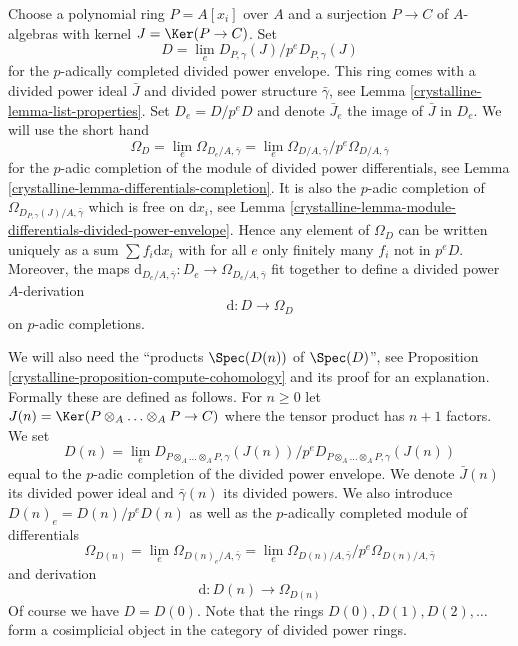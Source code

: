 \medskip\noindent
Choose a polynomial ring $P = A[x_i]$ over $A$ and a surjection $P \to C$
of $A$-algebras with kernel $J = \Ker(P \to C)$. Set
\begin{equation}
\label{equation-D}
D = \lim_e D_{P, \gamma}(J) / p^eD_{P, \gamma}(J)
\end{equation}
for the $p$-adically completed divided power envelope.
This ring comes with a divided power ideal $\bar J$ and divided power
structure $\bar \gamma$, see Lemma \ref{crystalline-lemma-list-properties}.
Set $D_e = D/p^eD$ and denote $\bar J_e$ the image of $\bar J$ in $D_e$.
We will use the short hand
\begin{equation}
\label{equation-omega-D}
\Omega_D = \lim_e \Omega_{D_e/A, \bar\gamma} =
\lim_e \Omega_{D/A, \bar\gamma}/p^e\Omega_{D/A, \bar\gamma}
\end{equation}
for the $p$-adic completion of the module of divided power differentials,
see Lemma \ref{crystalline-lemma-differentials-completion}.
It is also the $p$-adic completion of
$\Omega_{D_{P, \gamma}(J)/A, \bar\gamma}$
which is free on $\text{d}x_i$, see
Lemma \ref{crystalline-lemma-module-differentials-divided-power-envelope}.
Hence any element of $\Omega_D$ can be written uniquely as a sum
$\sum f_i\text{d}x_i$ with for all $e$ only finitely many $f_i$
not in $p^eD$. Moreover, the maps
$\text{d}_{D_e/A, \bar\gamma} : D_e \to \Omega_{D_e/A, \bar\gamma}$
fit together to define a divided power $A$-derivation
\begin{equation}
\label{equation-derivation-D}
\text{d} : D \longrightarrow \Omega_D
\end{equation}
on $p$-adic completions.

\medskip\noindent
We will also need the ``products $\Spec(D(n))$ of $\Spec(D)$'', see
Proposition \ref{crystalline-proposition-compute-cohomology} and its proof for an
explanation. Formally these are defined as follows. For $n \geq 0$ let
$J(n) = \Ker(P \otimes_A \ldots \otimes_A P \to C)$ where
the tensor product has $n + 1$ factors. We set
\begin{equation}
\label{equation-Dn}
D(n) = \lim_e
D_{P \otimes_A \ldots \otimes_A P, \gamma}(J(n))/
p^eD_{P \otimes_A \ldots \otimes_A P, \gamma}(J(n))
\end{equation}
equal to the $p$-adic completion of the divided power envelope.
We denote $\bar J(n)$ its divided power ideal and $\bar \gamma(n)$
its divided powers. We also introduce $D(n)_e = D(n)/p^eD(n)$ as well
as the $p$-adically completed module of differentials
\begin{equation}
\label{equation-omega-Dn}
\Omega_{D(n)} = \lim_e \Omega_{D(n)_e/A, \bar\gamma} =
\lim_e \Omega_{D(n)/A, \bar\gamma}/p^e\Omega_{D(n)/A, \bar\gamma}
\end{equation}
and derivation
\begin{equation}
\label{equation-derivation-Dn}
\text{d} : D(n) \longrightarrow \Omega_{D(n)}
\end{equation}
Of course we have $D = D(0)$. Note that the rings $D(0), D(1), D(2), \ldots$
form a cosimplicial object in the category of divided power rings.

